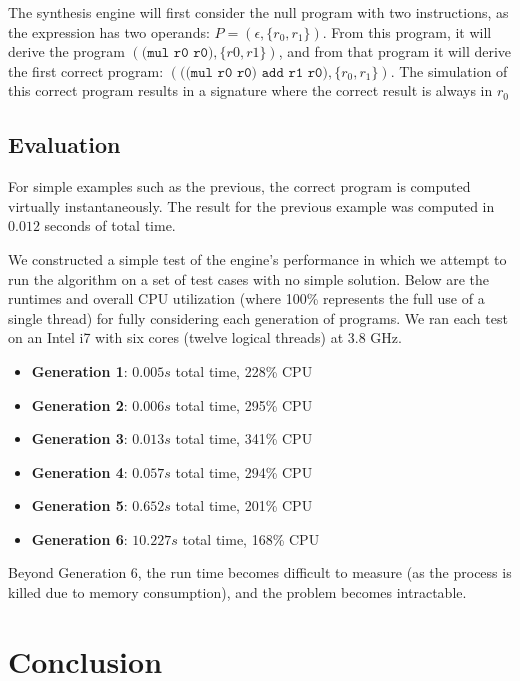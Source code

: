 \documentclass{article}
\begin{document}
The synthesis engine will first consider the null program with two
instructions, as the expression has two operands: $P = (\epsilon,\{r_{0},
r_{1}\})$.  From this program, it will derive the program $(\texttt{(mul r0
r0)}, \{r0, r1\})$, and from that program it will derive the first correct
program: $(\texttt{((mul r0 r0) add r1 r0)}, \{r_{0}, r_{1}\})$.  The
simulation of this correct program results in a signature where the correct
result is always in $r_{0}$

\subsection{Evaluation}

For simple examples such as the previous, the correct program is computed
virtually instantaneously. The result for the previous example was computed in
$0.012$ seconds of total time.

We constructed a simple test of the engine's performance in which we attempt to
run the algorithm on a set of test cases with no simple solution.  Below are
the runtimes and overall CPU utilization (where 100\% represents the full use
of a single thread) for fully considering each generation of programs.  We ran
each test on an Intel i7 with six cores (twelve logical threads) at 3.8 GHz.

\begin{itemize}
    \item \textbf{Generation 1}: $0.005s$ total time, 228\% CPU
    \item \textbf{Generation 2}: $0.006s$ total time, 295\% CPU
    \item \textbf{Generation 3}: $0.013s$ total time, 341\% CPU
    \item \textbf{Generation 4}: $0.057s$ total time, 294\% CPU
    \item \textbf{Generation 5}: $0.652s$ total time, 201\% CPU
    \item \textbf{Generation 6}: $10.227s$ total time, 168\% CPU
\end{itemize}

Beyond Generation 6, the run time becomes difficult to measure (as the process
is killed due to memory consumption), and the problem becomes intractable.

\section{Conclusion}
\label{sec:conclusion}
\end{document}
